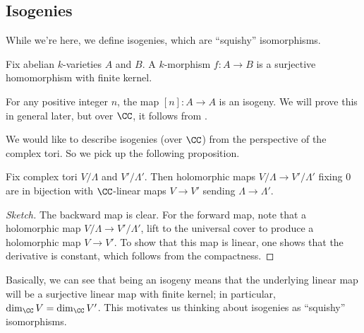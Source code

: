 \documentclass[../notes.tex]{subfiles}
\begin{document}
\subsection{Isogenies}
While we're here, we define isogenies, which are ``squishy'' isomorphisms.
\begin{definition}[isogenies]
	Fix abelian $k$-varieties $A$ and $B$. A $k$-morphism $f\colon A\to B$ is a surjective homomorphism with finite kernel.
\end{definition}
\begin{example}
	For any positive integer $n$, the map $[n]\colon A\to A$ is an isogeny. We will prove this in general later, but over $\CC$, it follows from .
\end{example}
We would like to describe isogenies (over $\CC$) from the perspective of the complex tori. So we pick up the following proposition.
\begin{proposition}
	Fix complex tori $V/\Lambda$ and $V'/\Lambda'$. Then holomorphic maps $V/\Lambda\to V'/\Lambda'$ fixing $0$ are in bijection with $\CC$-linear maps $V\to V'$ sending $\Lambda\to\Lambda'$.
\end{proposition}
\begin{proof}[Sketch]
	The backward map is clear. For the forward map, note that a holomorphic map $V/\Lambda\to V'/\Lambda'$, lift to the universal cover to produce a holomorphic map $V\to V'$. To show that this map is linear, one shows that the derivative is constant, which follows from the compactness.
\end{proof}
\begin{remark}
	Basically, we can see that being an isogeny means that the underlying linear map will be a surjective linear map with finite kernel; in particular, $\dim_\CC V=\dim_\CC V'$. This motivates us thinking about isogenies as ``squishy'' isomorphisms.
\end{remark}
\end{document}
